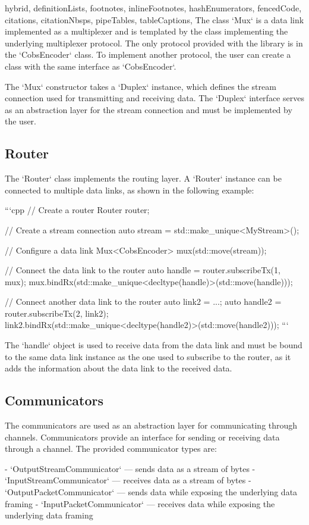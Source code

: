 \begin{markdown*}{%
  hybrid,
  definitionLists,
  footnotes,
  inlineFootnotes,
  hashEnumerators,
  fencedCode,
  citations,
  citationNbsps,
  pipeTables,
  tableCaptions,
}
The class `Mux` is a data link implemented as a multiplexer and is templated by the class implementing the underlying multiplexer protocol. The only protocol provided with the library is in the `CobsEncoder` class. To implement another protocol, the user can create a class with the same interface as `CobsEncoder`.

The `Mux` constructor takes a `Duplex` instance, which defines the stream connection used for transmitting and receiving data. The `Duplex` interface serves as an abstraction layer for the stream connection and must be implemented by the user.

\subsection{Router}

The `Router` class implements the routing layer. A `Router` instance can be connected to multiple data links, as shown in the following example:

```cpp
// Create a router
Router router;

// Create a stream connection
auto stream = std::make_unique<MyStream>();

// Configure a data link
Mux<CobsEncoder> mux(std::move(stream));

// Connect the data link to the router
auto handle = router.subscribeTx(1, mux);
mux.bindRx(std::make_unique<decltype(handle)>(std::move(handle)));

// Connect another data link to the router
auto link2 = ...;
auto handle2 = router.subscribeTx(2, link2);
link2.bindRx(std::make_unique<decltype(handle2)>(std::move(handle2)));
```

The `handle` object is used to receive data from the data link and must be bound to the same data link instance as the one used to subscribe to the router, as it adds the information about the data link to the received data.

\subsection{Communicators}

The communicators are used as an abstraction layer for communicating through channels. Communicators provide an interface for sending or receiving data through a channel. The provided communicator types are:

- `OutputStreamCommunicator` --- sends data as a stream of bytes
- `InputStreamCommunicator` --- receives data as a stream of bytes
- `OutputPacketCommunicator` --- sends data while exposing the underlying data framing
- `InputPacketCommunicator` --- receives data while exposing the underlying data framing


\end{markdown*}
